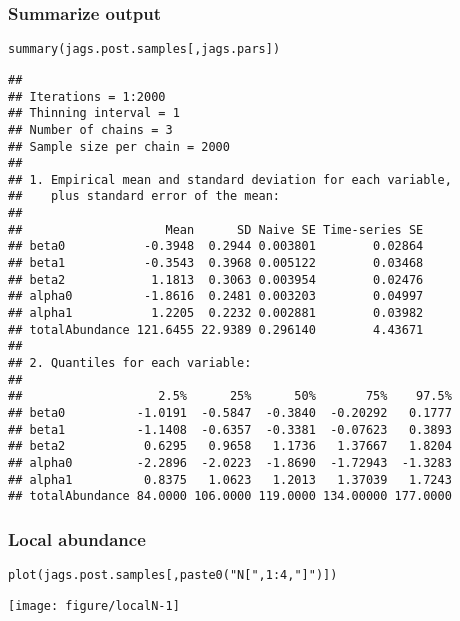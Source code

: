 \documentclass[color=usenames,dvipsnames]{beamer}\usepackage[]{graphicx}\usepackage[]{color}
\makeatletter
\newcommand{\hlnum}[1]{\textcolor[rgb]{0.69,0.494,0}{#1}}%
\newcommand{\hlstr}[1]{\textcolor[rgb]{0.749,0.012,0.012}{#1}}%
\newcommand{\hlopt}[1]{\textcolor[rgb]{0,0,0}{#1}}%
\newcommand{\hlstd}[1]{\textcolor[rgb]{0,0,0}{#1}}%
\newcommand{\hlkwd}[1]{\textcolor[rgb]{0.004,0.004,0.506}{#1}}%
\newenvironment{kframe}{%
 \def\at@end@of@kframe{}%
 \ifinner\ifhmode%
  \def\at@end@of@kframe{\end{minipage}}%
  \begin{minipage}{\columnwidth}%
 \fi\fi%
 \def\FrameCommand##1{\hskip\@totalleftmargin \hskip-\fboxsep
 \colorbox{shadecolor}{##1}\hskip-\fboxsep
     \hskip-\linewidth \hskip-\@totalleftmargin \hskip\columnwidth}%
 \MakeFramed {\advance\hsize-\width
   \@totalleftmargin\z@ \linewidth\hsize
   \@setminipage}}%
 {\par\unskip\endMakeFramed%
 \at@end@of@kframe}
\newenvironment{knitrout}{}{} %
\makeatother
\begin{document}
\begin{frame}[fragile]
  \frametitle{Summarize output}
\begin{knitrout}\tiny
{}\color{fgcolor}\begin{kframe}
\begin{alltt}
\hlkwd{summary}\hlstd{(jags.post.samples[,jags.pars])}
\end{alltt}
\begin{verbatim}
## 
## Iterations = 1:2000
## Thinning interval = 1 
## Number of chains = 3 
## Sample size per chain = 2000 
## 
## 1. Empirical mean and standard deviation for each variable,
##    plus standard error of the mean:
## 
##                    Mean      SD Naive SE Time-series SE
## beta0           -0.3948  0.2944 0.003801        0.02864
## beta1           -0.3543  0.3968 0.005122        0.03468
## beta2            1.1813  0.3063 0.003954        0.02476
## alpha0          -1.8616  0.2481 0.003203        0.04997
## alpha1           1.2205  0.2232 0.002881        0.03982
## totalAbundance 121.6455 22.9389 0.296140        4.43671
## 
## 2. Quantiles for each variable:
## 
##                   2.5%      25%      50%       75%    97.5%
## beta0          -1.0191  -0.5847  -0.3840  -0.20292   0.1777
## beta1          -1.1408  -0.6357  -0.3381  -0.07623   0.3893
## beta2           0.6295   0.9658   1.1736   1.37667   1.8204
## alpha0         -2.2896  -2.0223  -1.8690  -1.72943  -1.3283
## alpha1          0.8375   1.0623   1.2013   1.37039   1.7243
## totalAbundance 84.0000 106.0000 119.0000 134.00000 177.0000
\end{verbatim}
\end{kframe}
\end{knitrout}
\end{frame}


\begin{frame}[fragile]
  \frametitle{Local abundance}
\begin{knitrout}\scriptsize
{}\color{fgcolor}\begin{kframe}
\begin{alltt}
\hlkwd{plot}\hlstd{(jags.post.samples[,}\hlkwd{paste0}\hlstd{(}\hlstr{"N["}\hlstd{,} \hlnum{1}\hlopt{:}\hlnum{4}\hlstd{,} \hlstr{"]"}\hlstd{)])}
\end{alltt}
\end{kframe}

{\centering \texttt{[image: figure/localN-1]} 

}


\end{knitrout}
\end{frame}
\end{document}
